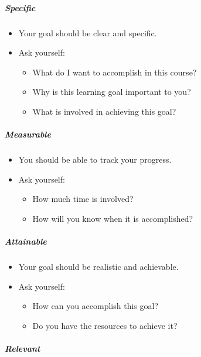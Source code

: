 \documentclass[
]{book}
\providecommand{\tightlist}{%
  \setlength{\itemsep}{0pt}\setlength{\parskip}{0pt}}
\begin{document}
\hypertarget{specific}{%
\subparagraph*{Specific}\label{specific}}

\begin{itemize}
\tightlist
\item
  Your goal should be clear and specific.
\item
  Ask yourself:

  \begin{itemize}
  \tightlist
  \item
    What do I want to accomplish in this course?
  \item
    Why is this learning goal important to you?
  \item
    What is involved in achieving this goal?
  \end{itemize}
\end{itemize}

\hypertarget{measurable}{%
\subparagraph*{Measurable}\label{measurable}}

\begin{itemize}
\tightlist
\item
  You should be able to track your progress.
\item
  Ask yourself:

  \begin{itemize}
  \tightlist
  \item
    How much time is involved?
  \item
    How will you know when it is accomplished?
  \end{itemize}
\end{itemize}

\hypertarget{attainable}{%
\subparagraph*{Attainable}\label{attainable}}

\begin{itemize}
\tightlist
\item
  Your goal should be realistic and achievable.
\item
  Ask yourself:

  \begin{itemize}
  \tightlist
  \item
    How can you accomplish this goal?
  \item
    Do you have the resources to achieve it?
  \end{itemize}
\end{itemize}

\hypertarget{relevant}{%
\subparagraph*{Relevant}\label{relevant}}
\end{document}
